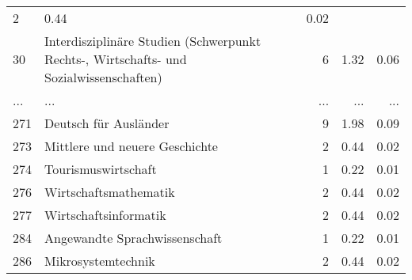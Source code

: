 \begin{longtable}{lXrrr}
          \num{2} &
          \num[round-mode=places,round-precision=2]{0,44} &
          \num[round-mode=places,round-precision=2]{0,02} \\
        30 & \multicolumn{1}{X}{Interdisziplinäre Studien (Schwerpunkt Rechts-, Wirtschafts- und Sozialwissenschaften)} & %
          \num{6} &
          \num[round-mode=places,round-precision=2]{1,32} &
          \num[round-mode=places,round-precision=2]{0,06} \\
       ... & ... & ... & ... & ... \\
        271 & \multicolumn{1}{X}{Deutsch für Ausländer} & %
          \num{9} &
          \num[round-mode=places,round-precision=2]{1,98} &
          \num[round-mode=places,round-precision=2]{0,09} \\

        273 & \multicolumn{1}{X}{Mittlere und neuere Geschichte} & %
          \num{2} &
          \num[round-mode=places,round-precision=2]{0,44} &
          \num[round-mode=places,round-precision=2]{0,02} \\

        274 & \multicolumn{1}{X}{Tourismuswirtschaft} & %
          \num{1} &
          \num[round-mode=places,round-precision=2]{0,22} &
          \num[round-mode=places,round-precision=2]{0,01} \\

        276 & \multicolumn{1}{X}{Wirtschaftsmathematik} & %
          \num{2} &
          \num[round-mode=places,round-precision=2]{0,44} &
          \num[round-mode=places,round-precision=2]{0,02} \\

        277 & \multicolumn{1}{X}{Wirtschaftsinformatik} & %
          \num{2} &
          \num[round-mode=places,round-precision=2]{0,44} &
          \num[round-mode=places,round-precision=2]{0,02} \\

        284 & \multicolumn{1}{X}{Angewandte Sprachwissenschaft} & %
          \num{1} &
          \num[round-mode=places,round-precision=2]{0,22} &
          \num[round-mode=places,round-precision=2]{0,01} \\

        286 & \multicolumn{1}{X}{Mikrosystemtechnik} & %
          \num{2} &
          \num[round-mode=places,round-precision=2]{0,44} &
          \num[round-mode=places,round-precision=2]{0,02} \\


\end{longtable}

